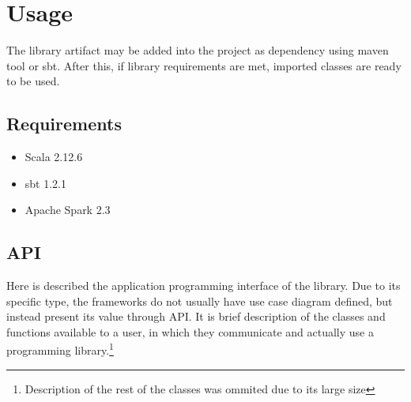 \section{Usage}
The library artifact may be added into the project as dependency using maven tool or sbt. After this, if library requirements are met, imported classes are ready to be used.

\subsection{Requirements}
\begin{itemize}
\item Scala 2.12.6
\item sbt 1.2.1
\item Apache Spark 2.3

\end{itemize}

\bigbreak
\subsection{API}
Here is described the application programming interface of the library. Due to its specific type, the frameworks do not usually have use case diagram defined, but instead present its value through API. It is brief description of the classes and functions available to a user, in which they communicate and actually use a programming library.\footnote{Description of the rest of the classes was ommited due to its large size}

